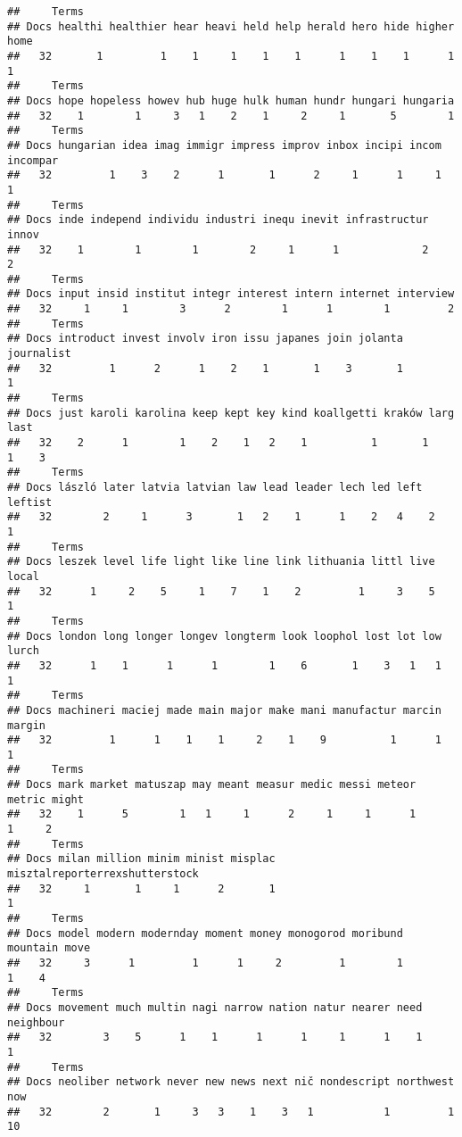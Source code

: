 \documentclass[]{article}
\begin{document}
\begin{verbatim}
##     Terms
## Docs healthi healthier hear heavi held help herald hero hide higher home
##   32       1         1    1     1    1    1      1    1    1      1    1
##     Terms
## Docs hope hopeless howev hub huge hulk human hundr hungari hungaria
##   32    1        1     3   1    2    1     2     1       5        1
##     Terms
## Docs hungarian idea imag immigr impress improv inbox incipi incom incompar
##   32         1    3    2      1       1      2     1      1     1        1
##     Terms
## Docs inde independ individu industri inequ inevit infrastructur innov
##   32    1        1        1        2     1      1             2     2
##     Terms
## Docs input insid institut integr interest intern internet interview
##   32     1     1        3      2        1      1        1         2
##     Terms
## Docs introduct invest involv iron issu japanes join jolanta journalist
##   32         1      2      1    2    1       1    3       1          1
##     Terms
## Docs just karoli karolina keep kept key kind koallgetti kraków larg last
##   32    2      1        1    2    1   2    1          1       1    1    3
##     Terms
## Docs lászló later latvia latvian law lead leader lech led left leftist
##   32        2     1      3       1   2    1      1    2   4    2       1
##     Terms
## Docs leszek level life light like line link lithuania littl live local
##   32      1     2    5     1    7    1    2         1     3    5     1
##     Terms
## Docs london long longer longev longterm look loophol lost lot low lurch
##   32      1    1      1      1        1    6       1    3   1   1     1
##     Terms
## Docs machineri maciej made main major make mani manufactur marcin margin
##   32         1      1    1    1     2    1    9          1      1      1
##     Terms
## Docs mark market matuszap may meant measur medic messi meteor metric might
##   32    1      5        1   1     1      2     1     1      1      1     2
##     Terms
## Docs milan million minim minist misplac misztalreporterrexshutterstock
##   32     1       1     1      2       1                              1
##     Terms
## Docs model modern modernday moment money monogorod moribund mountain move
##   32     3      1         1      1     2         1        1        1    4
##     Terms
## Docs movement much multin nagi narrow nation natur nearer need neighbour
##   32        3    5      1    1      1      1     1      1    1         1
##     Terms
## Docs neoliber network never new news next nič nondescript northwest now
##   32        2       1     3   3    1    3   1           1         1  10

\end{verbatim}
\end{document}
